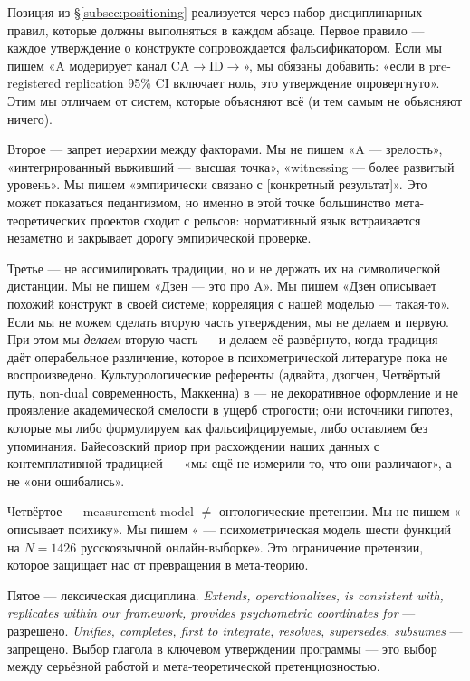 Позиция из §\ref{subsec:positioning} реализуется через набор дисциплинарных правил, которые должны выполняться в каждом абзаце. Первое правило --- каждое утверждение о конструкте сопровождается фальсификатором. Если мы пишем «A модерирует канал CA$\to$ID$\to$\EAF{}», мы обязаны добавить: «если в pre-registered replication \IMM{} 95\% CI включает ноль, это утверждение опровергнуто». Этим мы отличаем \DEIC{} от систем, которые объясняют всё (и тем самым не объясняют ничего).

Второе --- запрет иерархии между факторами. Мы не пишем «A --- зрелость», «интегрированный выживший --- высшая точка», «witnessing --- более развитый уровень». Мы пишем «эмпирически связано с [конкретный результат]». Это может показаться педантизмом, но именно в этой точке большинство мета-теоретических проектов сходит с рельсов: нормативный язык встраивается незаметно и закрывает дорогу эмпирической проверке.

Третье --- не ассимилировать традиции, но и не держать их на символической дистанции. Мы не пишем «Дзен --- это про A». Мы пишем «Дзен описывает похожий конструкт в своей системе; корреляция с нашей моделью --- такая-то». Если мы не можем сделать вторую часть утверждения, мы не делаем и первую. При этом мы \emph{делаем} вторую часть --- и делаем её развёрнуто, когда традиция даёт операбельное различение, которое в психометрической литературе пока не воспроизведено. Культурологические референты (адвайта, дзогчен, Четвёртый путь, non-dual современность, Маккенна) в \DEIC{} --- не декоративное оформление и не проявление академической смелости в ущерб строгости; они источники гипотез, которые мы либо формулируем как фальсифицируемые, либо оставляем без упоминания. Байесовский приор при расхождении наших данных с контемплативной традицией --- «мы ещё не измерили то, что они различают», а не «они ошибались».

Четвёртое --- measurement model $\neq$ онтологические претензии. Мы не пишем «\DEIC{} описывает психику». Мы пишем «\DEIC{} --- психометрическая модель шести функций на $N = 1426$ русскоязычной онлайн-выборке». Это ограничение претензии, которое защищает нас от превращения в мета-теорию.

Пятое --- лексическая дисциплина. \emph{Extends, operationalizes, is consistent with, replicates within our framework, provides psychometric coordinates for} --- разрешено. \emph{Unifies, completes, first to integrate, resolves, supersedes, subsumes} --- запрещено. Выбор глагола в ключевом утверждении программы --- это выбор между серьёзной работой и мета-теоретической претенциозностью.

